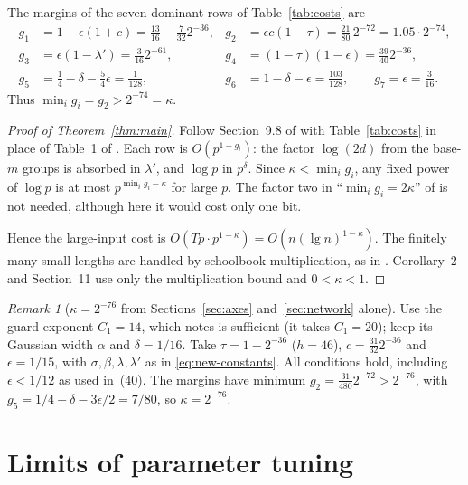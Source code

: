 \documentclass[11pt]{article}
\numberwithin{equation}{section}
\numberwithin{table}{section}
\theoremstyle{remark}
\newtheorem{remark}[theorem]{Remark}
\newcommand{\OAI}{\cite{OAI}}
\begin{document}
The margins of the seven dominant rows of Table~\ref{tab:costs} are
\begin{equation}\label{eq:margins}
\begin{aligned}
 g_1&=1-\epsilon(1+c)=\tfrac{13}{16}-\tfrac7{32}2^{-36}, &
 g_2&=\epsilon c(1-\tau)=\tfrac{21}{80}\,2^{-72}=1.05\cdot2^{-74},\\
 g_3&=\epsilon(1-\lambda')=\tfrac3{16}2^{-61}, &
 g_4&=(1-\tau)(1-\epsilon)=\tfrac{39}{40}2^{-36},\\
 g_5&=\tfrac14-\delta-\tfrac54\epsilon=\tfrac1{128}, &
 g_6&=1-\delta-\epsilon=\tfrac{103}{128},\qquad g_7=\epsilon=\tfrac3{16}.
\end{aligned}
\end{equation}
Thus $\min_ig_i=g_2>2^{-74}=\kappa$.

\begin{proof}[Proof of Theorem~\ref{thm:main}]
Follow Section~9.8 of \OAI{} with Table~\ref{tab:costs} in place of
Table~1 of \OAI. Each row is $O(p^{1-g_i})$: the factor $\log(2d)$ from the
base-$m$ groups is absorbed in $\lambda'$, and $\log p$ in $p^\delta$.
Since $\kappa<\min_ig_i$, any fixed power of $\log p$ is at most
$p^{\min_ig_i-\kappa}$ for large $p$. The factor two in ``$\min_i
g_i=2\kappa$'' of \OAI{} is not needed, although here it would cost only
one bit.

Hence the large-input cost is
$O(Tp\cdot p^{1-\kappa})=O(n(\lg n)^{1-\kappa})$. The finitely many
small lengths are handled by schoolbook multiplication, as in \OAI.
Corollary~2 and Section~11 use only the multiplication bound and
$0<\kappa<1$.
\end{proof}

\begin{remark}[$\kappa=2^{-76}$ from Sections~\ref{sec:axes}
and~\ref{sec:network} alone]\label{rem:setA}
Use the guard exponent $C_1=14$, which \OAI{} notes is sufficient (it
takes $C_1=20$); keep its Gaussian width $\alpha$ and $\delta=1/16$. Take
$\tau=1-2^{-36}$ ($h=46$), $c=\tfrac{31}{32}2^{-36}$ and $\epsilon=1/15$,
with $\sigma,\beta,\lambda,\lambda'$ as in \eqref{eq:new-constants}. All
conditions hold, including $\epsilon<1/12$ as used in~(40). The margins
have minimum $g_2=\tfrac{31}{480}2^{-72}>2^{-76}$, with
$g_5=1/4-\delta-3\epsilon/2=7/80$, so $\kappa=2^{-76}$.
\end{remark}

\section{Limits of parameter tuning}\label{sec:limits}
\end{document}
